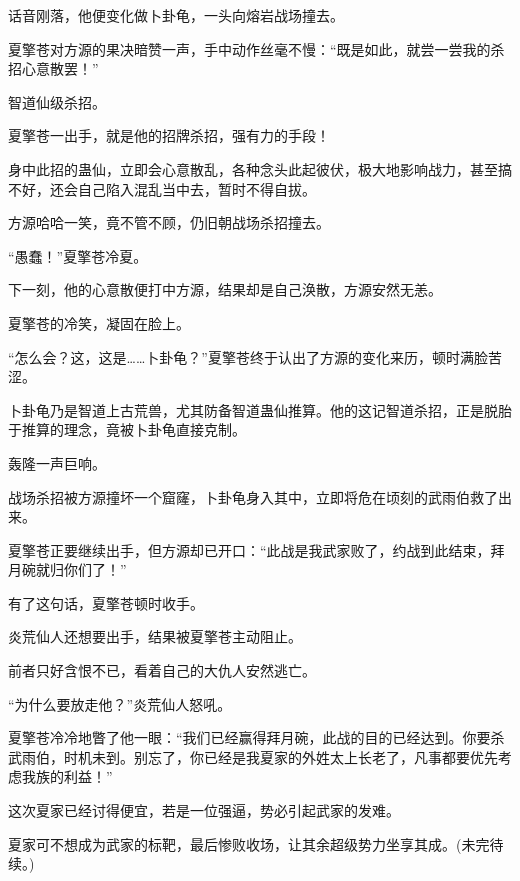 \begin{this_body}
话音刚落，他便变化做卜卦龟，一头向熔岩战场撞去。

夏擎苍对方源的果决暗赞一声，手中动作丝毫不慢：“既是如此，就尝一尝我的杀招心意散罢！”

智道仙级杀招。

夏擎苍一出手，就是他的招牌杀招，强有力的手段！

身中此招的蛊仙，立即会心意散乱，各种念头此起彼伏，极大地影响战力，甚至搞不好，还会自己陷入混乱当中去，暂时不得自拔。

方源哈哈一笑，竟不管不顾，仍旧朝战场杀招撞去。

“愚蠢！”夏擎苍冷夏。

下一刻，他的心意散便打中方源，结果却是自己涣散，方源安然无恙。

夏擎苍的冷笑，凝固在脸上。

“怎么会？这，这是……卜卦龟？”夏擎苍终于认出了方源的变化来历，顿时满脸苦涩。

卜卦龟乃是智道上古荒兽，尤其防备智道蛊仙推算。他的这记智道杀招，正是脱胎于推算的理念，竟被卜卦龟直接克制。

轰隆一声巨响。

战场杀招被方源撞坏一个窟窿，卜卦龟身入其中，立即将危在顷刻的武雨伯救了出来。

夏擎苍正要继续出手，但方源却已开口：“此战是我武家败了，约战到此结束，拜月碗就归你们了！”

有了这句话，夏擎苍顿时收手。

炎荒仙人还想要出手，结果被夏擎苍主动阻止。

前者只好含恨不已，看着自己的大仇人安然逃亡。

“为什么要放走他？”炎荒仙人怒吼。

夏擎苍冷冷地瞥了他一眼：“我们已经赢得拜月碗，此战的目的已经达到。你要杀武雨伯，时机未到。别忘了，你已经是我夏家的外姓太上长老了，凡事都要优先考虑我族的利益！”

这次夏家已经讨得便宜，若是一位强逼，势必引起武家的发难。

夏家可不想成为武家的标靶，最后惨败收场，让其余超级势力坐享其成。(未完待续。)

\end{this_body}


